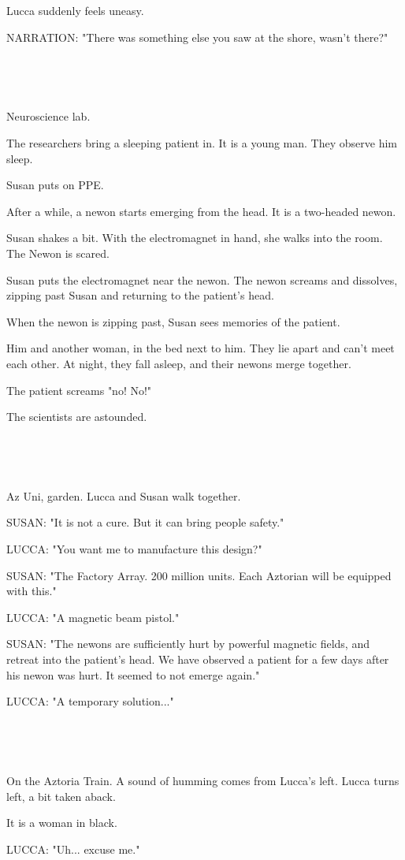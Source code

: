 \documentclass[11pt]{article}
\begin{document}
Lucca suddenly feels uneasy.

NARRATION: "There was something else you saw at the shore, wasn't there?"

\ 

\ 

Neuroscience lab.

The researchers bring a sleeping patient in. 
It is a young man.
They observe him sleep.

Susan puts on PPE.

After a while, a newon starts emerging from the head.
It is a two-headed newon.

Susan shakes a bit.
With the electromagnet in hand, she walks into the room.
The Newon is scared.

Susan puts the electromagnet near the newon.
The newon screams and dissolves, zipping past Susan and returning to the patient's head.

When the newon is zipping past, Susan sees memories of the patient.

Him and another woman, in the bed next to him. 
They lie apart and can't meet each other.
At night, they fall asleep, and their newons merge together.

The patient screams "no! No!"

The scientists are astounded.

\ 

\ 

Az Uni, garden.
Lucca and Susan walk together.

SUSAN: "It is not a cure.
But it can bring people safety."

LUCCA: "You want me to manufacture this design?"

SUSAN: "The Factory Array. 
200 million units.
Each Aztorian will be equipped with this."

LUCCA: "A magnetic beam pistol."

SUSAN: "The newons are sufficiently hurt by powerful magnetic fields, and retreat into the patient's head.
We have observed a patient for a few days after his newon was hurt.
It seemed to not emerge again."

LUCCA: "A temporary solution..."

\ 

\ 

On the Aztoria Train.
A sound of humming comes from Lucca's left.
Lucca turns left, a bit taken aback.

It is a woman in black.

LUCCA: "Uh... excuse me."
\end{document}
